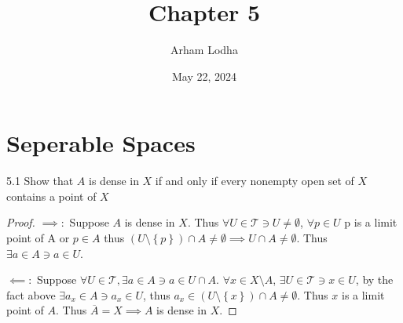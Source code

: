 \documentclass{article}
\newcommand*{\T}{\mathcal{T}}
\begin{document}
\title{Chapter 5}
\author{Arham Lodha}%
\date{May 22, 2024}%
\maketitle

\section{Seperable Spaces}
\begin{PROB}{5.1}\label{Problem 5.1.}
    Show that $A$ is dense in $X$ if and only if every nonempty open set of $X$ contains a point of $X$      
\end{PROB}
\begin{proof}
    $\implies:$ Suppose $A$ is dense in $X$. Thus $\forall U \in \T \ni U \neq \emptyset$, $\forall p \in U $ p is a limit point of A or $p \in A$ thus $(U \setminus \left\{ p \right\}) \cap A \neq \emptyset \implies U \cap A \neq \emptyset$. Thus $\exists a \in A \ni a \in U$. 
    
    $\impliedby:$ Suppose $\forall U \in \T, \exists a \in A \ni a \in U \cap A$. $\forall x \in X \setminus A$, $\exists U \in \T \ni x \in U$, by the fact above $\exists a_x \in A \ni a_x \in U$, thus $a_x \in \left(U \setminus \left\{ x \right\}\right) \cap A \neq \emptyset$. Thus $x$ is a limit point of $A$. Thus $\overline{A} = X \implies A$ is dense in $X$.            
\end{proof}

\bigskip
\end{document}

